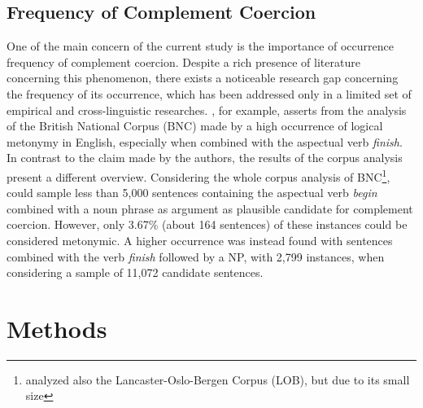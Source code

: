 \documentclass{article}
\begin{document}
\subsection{Frequency of Complement Coercion} %
One of the main concern of the current study is the importance of occurrence frequency of complement coercion. 
Despite a rich presence of literature concerning this phenomenon, there exists a noticeable research gap concerning the frequency of its occurrence, which has been addressed only in a limited set of empirical and cross-linguistic researches. \textcite{shutova_logical_2009}, for example, asserts from the analysis of the British National Corpus (BNC) made by \textcite{verspoor_conventionality-governed_1997} a high occurrence of logical metonymy in English, especially when combined with the aspectual verb \emph{finish}. In contrast to the claim made by the authors, the results of the corpus analysis present a different overview. Considering the whole corpus analysis of BNC\footnote{\textcite{verspoor_conventionality-governed_1997} analyzed also the Lancaster-Oslo-Bergen Corpus (LOB), but due to its small size},  
\textcite{verspoor_conventionality-governed_1997} could sample less than 5,000 sentences containing the aspectual verb \emph{begin} combined with a noun phrase as argument as plausible candidate for complement coercion. However, only 3.67\% (about 164 sentences) of these instances could be considered metonymic. A higher occurrence was instead found with sentences combined with the verb \emph{finish} followed by a NP, with 2,799 instances, when considering a sample of 11,072 candidate sentences. 

\section{Methods}
\end{document}
